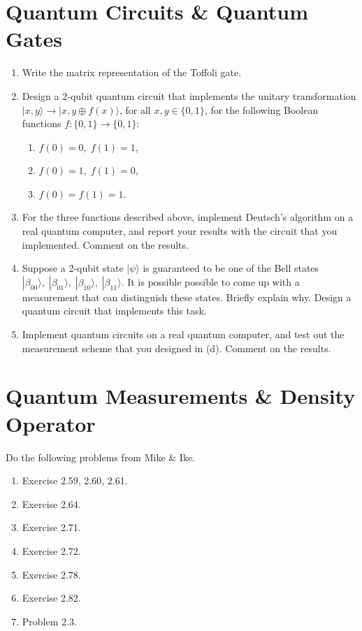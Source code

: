 \documentclass[10pt]{article}
\newcounter{ex}
\theoremstyle{plain}
\theoremstyle{definition}
\begin{document}
\section{Quantum Circuits \& Quantum Gates}

\begin{enumerate}[label=(\alph*)]

\item Write the matrix representation of the Toffoli gate.

\item Design a 2-qubit quantum circuit that implements the unitary transformation $| x,y \rangle \rightarrow | x, y \oplus f(x) \rangle$, for all $x,y \in \{0,1\}$, for the following Boolean functions $f: \{0,1\} \rightarrow \{0,1\}$:
\begin{enumerate}[label=(\roman*)]
\item $f(0) = 0, \; f(1) = 1$,
\item $f(0) = 1, \; f(1) = 0$,
\item $f(0) = f(1) = 1$.
\end{enumerate}

\item For the three functions described above, implement Deutsch's algorithm on a real quantum computer, and report your results with the circuit that you implemented. Comment on the results.

\item Suppose a 2-qubit state $| \psi \rangle$ is guaranteed to be one of the Bell states $| \beta_{00} \rangle, \; | \beta_{01} \rangle, \; | \beta_{10} \rangle, \; | \beta_{11} \rangle$. It is possible possible to come up with a measurement that can distinguish these states. Briefly explain why. Design a quantum circuit that implements this task.

\item Implement quantum circuits on a real quantum computer, and test out the measurement scheme that you designed in (d). Comment on the results.
\end{enumerate}

\section{Quantum Measurements \& Density Operator}

Do the following problems from Mike \& Ike.

\begin{enumerate}[label=(\alph*)]
\item Exercise 2.59, 2.60, 2.61.
\item Exercise 2.64.
\item Exercise 2.71.
\item Exercise 2.72.
\item Exercise 2.78.
\item Exercise 2.82.
\item Problem 2.3.
\end{enumerate}
\end{document}
